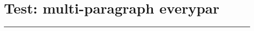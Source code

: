 \documentclass[a4paper,11pt]{article}
\begin{document}
\section*{Test: multi-paragraph everypar}
\begin{swarmwrap}%
  \begin{minipage}[t]{3cm}
    \centering
    \rule{\linewidth}{5cm}
  \end{minipage}%
\end{swarmwrap}%
\swarmwrapnext
\lipsum[1]\lipsum[2]\lipsum[3]
\end{document}
